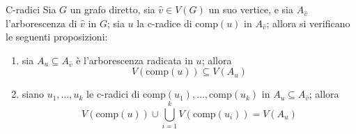 \documentclass[a4paper, 12pt]{report}
\begin{document}
    \begin{framedthm}[label={cradiciteorema}]{C-radici}
        Sia $G$ un grafo diretto, sia $\hat v \in V(G)$ un suo vertice, e sia $A_{\hat v}$ l'arborescenza di $\hat v$ in $G$; sia $u$ la c-radice di $\mathrm{comp}(u)$ in $A_{\hat v}$; allora si verificano le seguenti proposizioni:

        \begin{enumerate}[label=\roman*), font=\itshape]
            \item sia $A_u \subseteq A_{\hat v}$ è l'arborescenza radicata in $u$; allora $$V(\mathrm{comp}(u)) \subseteq V(A_u)$$
            \item siano $u_1, \ldots, u_k$ le c-radici di $\mathrm{comp}(u_1), \ldots, \mathrm{comp}(u_k)$ in $A_u \subseteq A_{\hat v}$; allora $$V(\mathrm{comp}(u)) \cup \displaystyle \bigcup_{i = 1}^k {V(\mathrm{comp}(u_i))} = V(A_u)$$
        \end{enumerate}
    \end{framedthm}
\end{document}

